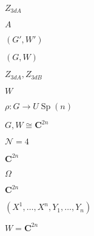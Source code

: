\begin{preview}
\setcounter{equation}{0}%
\(  Z_{3dA} \)
\end{preview}

\begin{preview}
\setcounter{equation}{0}%
\( A \)
\end{preview}

\begin{preview}
\setcounter{equation}{0}%
\( (G', W') \)
\end{preview}

\begin{preview}
\setcounter{equation}{0}%
\( (G,W) \)
\end{preview}

\begin{preview}
\setcounter{equation}{0}%
\( Z_{3dA}, Z_{3dB} \)
\end{preview}

\begin{preview}
\setcounter{equation}{0}%
\( W \)
\end{preview}

\begin{preview}
\setcounter{equation}{0}%
\( \rho : G \to U \operatorname{Sp}(n) \)
\end{preview}

\begin{preview}
\setcounter{equation}{0}%
\( G , W \cong \mathbf{C}^{2n} \)
\end{preview}

\begin{preview}
\setcounter{equation}{0}%
\( \mathcal{N}=4 \)
\end{preview}

\begin{preview}
\setcounter{equation}{0}%
\( \mathbf{C}^{2n} \)
\end{preview}

\begin{preview}
\setcounter{equation}{0}%
\( \Omega \)
\end{preview}

\begin{preview}
\setcounter{equation}{0}%
\( \mathbf{C}^{2n} \)
\end{preview}

\begin{preview}
\setcounter{equation}{0}%
\( (X^{1}, \ldots , X^{n}, Y_{1} , \ldots , Y_{n}) \)
\end{preview}

\begin{preview}
\setcounter{equation}{0}%
\( W = \mathbf{C}^{2n} \)
\end{preview}

